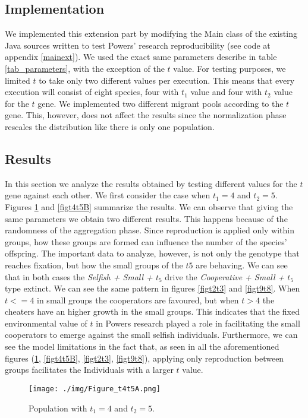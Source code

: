 \documentclass[runningheads]{llncs}
\begin{document}
\subsection{Implementation}
We implemented this extension part by modifying the Main class of the
existing Java sources written to test Powers' research
reproducibility (see code at appendix \ref{mainext}). We used the
exact same parameters describe in table \ref{tab_parameters}, with the
exception of the $t$ value. For testing
purposes, we limited $t$ to take only two different values per
execution. This means that every execution will consist of eight species,
four with $t_1$ value and four with $t_2$ value for the $t$ gene. We
implemented two different migrant pools according to the $t$
gene. This, however, does not affect the results since the
normalization phase rescales the distribution like there is only one
population. 

\subsection{Results}
In this section we analyze the results obtained by testing different
values for the $t$ gene against each other. We first consider the case
when $t_1 = 4$ and $t_2 = 5$. Figures \ref{figt4t5A} and \ref{figt4t5B}
summarize the results. We can observe that giving the same parameters
we obtain two different results. This happens because of the
randomness of the aggregation phase. Since reproduction is applied
only within groups, how these groups are formed can influence the
number of the species' offspring. The important data to analyze,
however, is not only the genotype that reaches fixation, but how the small
groups of the $t5$ are behaving. We can see that in both cases the
\textit{Selfish + Small + $t_5$} drive the \textit{Cooperative +
Small + $t_5$} type extinct. We can see the same pattern in figures
\ref{figt2t3} and \ref{figt9t8}. When $t <= 4$ in small groups the
cooperators are favoured, but when $t > 4$ the cheaters have an higher
growth in the small groups. This indicates that the fixed
environmental value of $t$ in Powers research played a role in
facilitating the small cooperators to emerge against the small selfish
individuals. Furthermore, we can see the model limitations in the fact
that, as seen in all the aforementioned figures (\ref{figt4t5A},
\ref{figt4t5B}, \ref{figt2t3}, \ref{figt9t8}), applying only
reproduction between groups facilitates the Individuals with a larger
$t$ value.

\begin{figure}
\texttt{[image: ./img/Figure\_t4t5A.png]}
\caption{Population with $t_1 = 4$ and $t_2 = 5$.} \label{figt4t5A}
\end{figure}
\end{document}
